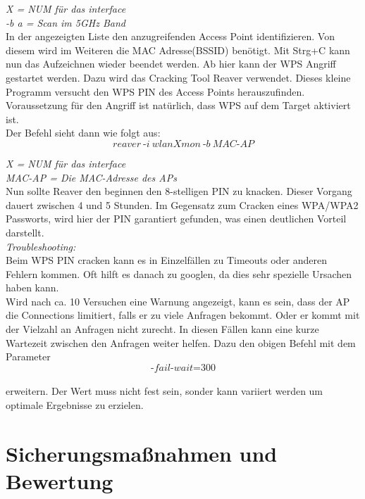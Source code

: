 	\textit{X = NUM für das interface}\\
	\textit{-b a = Scan im 5GHz Band}\\	

In der angezeigten Liste den anzugreifenden Access Point identifizieren. Von diesem wird im Weiteren die MAC Adresse(BSSID) benötigt.
Mit Strg+C kann nun das Aufzeichnen wieder beendet werden. Ab hier kann der WPS Angriff gestartet werden. Dazu wird das Cracking Tool Reaver verwendet. Dieses kleine Programm versucht den WPS PIN des Access Points herauszufinden. Voraussetzung für den Angriff ist natürlich, dass WPS auf dem Target aktiviert ist. \\

Der Befehl sieht dann wie folgt aus:\\


$$reaver~\text{-}i~wlanXmon~\text{-}b~MAC\text{-}AP$$

\textit{X = NUM für das interface}\\ 
\textit{MAC-AP = Die MAC-Adresse des APs}\\ 

Nun sollte Reaver den beginnen den 8-stelligen PIN zu knacken. Dieser Vorgang dauert zwischen 4 und 5 Stunden. Im Gegensatz zum Cracken eines WPA/WPA2 Passworts, wird hier der PIN garantiert gefunden, was einen deutlichen Vorteil darstellt. \\

\textit{Troubleshooting:}\\

Beim WPS PIN cracken kann es in Einzelfällen zu Timeouts oder anderen Fehlern kommen. Oft hilft es danach zu googlen, da dies sehr spezielle Ursachen haben kann. \\

Wird nach ca. 10 Versuchen eine Warnung angezeigt, kann es sein, dass der AP die Connections limitiert, falls er zu viele Anfragen bekommt. Oder er kommt mit der Vielzahl an Anfragen nicht zurecht. In diesen Fällen kann eine kurze Wartezeit zwischen den Anfragen weiter helfen. Dazu den obigen Befehl mit dem Parameter\\

$$\text{-}fail\text{-}wait\text{=}300$$\\

erweitern. Der Wert muss nicht fest sein, sonder kann variiert werden um optimale Ergebnisse zu erzielen. 



\section{Sicherungsmaßnahmen und Bewertung}


